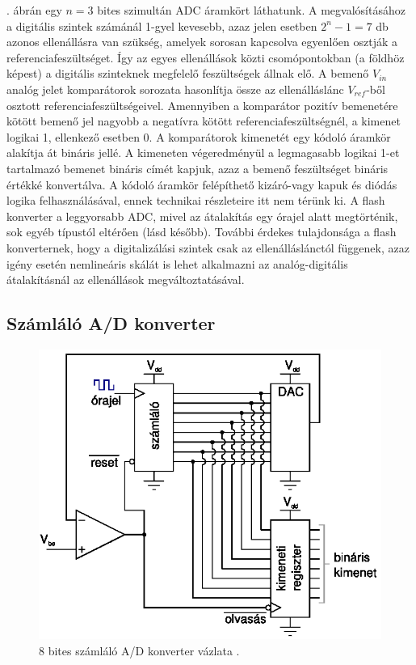 \documentclass[12pt]{article}
\theoremstyle{plain}
\begin{document}
. ábrán egy $n=3$ bites szimultán ADC áramkört láthatunk. A megvalósításához a digitális szintek számánál 1-gyel kevesebb, azaz jelen esetben $2^n - 1 = 7$ db azonos ellenállásra van szükség, amelyek sorosan kapcsolva egyenlően osztják a referenciafeszültséget. Így az egyes ellenállások közti csomópontokban (a földhöz képest) a digitális szinteknek megfelelő feszültségek állnak elő. A bemenő $V_{in}$ analóg jelet komparátorok sorozata hasonlítja össze az ellenálláslánc $V_{ref}$-ből osztott referenciafeszültségeivel. Amennyiben a komparátor pozitív bemenetére kötött bemenő jel nagyobb a negatívra kötött referenciafeszültségnél, a kimenet logikai 1, ellenkező esetben 0. A komparátorok kimenetét egy kódoló áramkör alakítja át bináris jellé. A kimeneten végeredményül a legmagasabb logikai 1-et tartalmazó bemenet bináris címét kapjuk, azaz a bemenő feszültséget bináris értékké konvertálva. A kódoló áramkör felépíthető kizáró-vagy kapuk és diódás logika felhasználásával, ennek technikai részleteire itt nem térünk ki. A flash konverter a leggyorsabb ADC, mivel az átalakítás egy órajel alatt megtörténik, sok egyéb típustól eltérően (lásd később). További érdekes tulajdonsága a flash konverternek, hogy a digitalizálási szintek csak az ellenálláslánctól függenek, azaz igény esetén nemlineáris skálát is lehet alkalmazni az analóg-digitális átalakításnál az ellenállások megváltoztatásával.



\subsection{Számláló A/D konverter}

\begin{figure}[]
	\centering
	\includegraphics[width=0.7\linewidth]{media/ADC_szamlalo}
	\caption{8 bites számláló A/D konverter vázlata \cite{Bagoly}.}
	\label{fig:adcszamlalo}
\end{figure}
\end{document}
